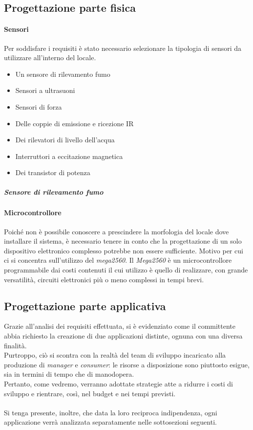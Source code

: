 \documentclass[12pt]{article}
\begin{document}
\subsection{Progettazione parte fisica}
\paragraph{Sensori}
Per soddisfare i requisiti è stato necessario selezionare la tipologia di sensori da utilizzare all'interno del locale.
\begin{itemize}
\item Un sensore di rilevamento fumo
\item Sensori a ultrasuoni
\item Sensori di forza
\item Delle coppie di emissione e ricezione IR
\item Dei rilevatori di livello dell'acqua
\item Interruttori a eccitazione magnetica
\item Dei transistor di potenza
\end{itemize}

\subparagraph{Sensore di rilevamento fumo}


\paragraph{Microcontrollore}
Poiché non è possibile conoscere a prescindere la morfologia del locale dove installare il sistema, è necessario tenere in conto che la progettazione di un solo dispositivo elettronico complesso potrebbe non essere sufficiente. Motivo per cui ci si concentra sull'utilizzo del \textit{mega2560}.
Il \textit{Mega2560} è un microcontrollore programmabile dai costi contenuti il cui utilizzo è quello di realizzare, con grande versatilità, circuiti elettronici più o meno complessi in tempi brevi.



\newpage
\subsection{Progettazione parte applicativa}
Grazie all'analisi dei requisiti effettuata, si è evidenziato come il committente abbia richiesto la creazione di due applicazioni distinte, ognuna con una diversa finalità.\\
Purtroppo, ciò si scontra con la realtà del team di sviluppo incaricato alla produzione di \textit{manager} e \textit{consumer}: le risorse a disposizione sono piuttosto esigue, sia in termini di tempo che di manodopera.\\
Pertanto, come vedremo, verranno adottate strategie atte a ridurre i costi di sviluppo e rientrare, così, nel budget e nei tempi previsti.\\\\
Si tenga presente, inoltre, che data la loro reciproca indipendenza, ogni applicazione verrà analizzata separatamente nelle sottosezioni seguenti.
\end{document}
